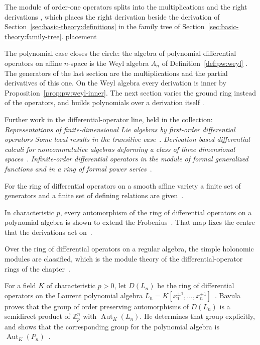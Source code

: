 The module of order-one operators splits into the multiplications and the
right derivations \cite[p.~29]{Sweedler1980}, which places the right
derivation beside the derivation of Section~\ref{sec:basic-theory:definitions}
in the family tree of Section~\ref{sec:basic-theory:family-tree}.
placement

The polynomial case closes the circle: the algebra of polynomial differential
operators on affine $n$-space is the Weyl algebra $A_{n}$ of
Definition~\ref{def:pw:weyl} \cite[p.~1]{BelovKanelKontsevich2007}. The
generators of the last section are the multiplications and the partial
derivatives of this one.
On the Weyl algebra every derivation is inner by
Proposition~\ref{prop:pw:weyl-inner}. The next section varies the ground ring
instead of the operators, and builds polynomials over a derivation itself
\cite[p.~480]{Ore1933}.

Further work in the differential-operator line, held in the collection:
\noindent\emph{Representations of finite-dimensional Lie algebras by
first-order differential operators Some local results in the transitive
case}~\cite{LibRepresentationsOfFiniteDimensional1995}.
\noindent\emph{Derivation based differential calculi for noncommutative
algebras deforming a class of three dimensional
spaces}~\cite{LibDerivationBasedDifferentialCalculi2018}.
\noindent\emph{Infinite-order differential operators in the module of formal
generalized functions and in a ring of formal power
series}~\cite{LibInfiniteOrderDifferentialOperators2022}.

For the ring of differential operators on a smooth affine variety a finite set
of generators and a finite set of defining relations are
given~\cite{WlGeneratorsAndDefining2010}.

In characteristic $p$, every automorphism of the ring of differential operators
on a polynomial algebra is shown to extend the Frobenius~\cite{WlExtensionsOfTheFrobeniusToTheR2017}. That map fixes the
centre that the derivations act
on~\cite{WlExtensionsOfTheFrobeniusToTheR2017}.

Over the ring of differential operators on a regular algebra, the simple
holonomic modules are classified, which is the module theory of the
differential-operator rings of the
chapter~\cite{WlSimpleHolonomicModulesOverRing2019}.

For a field $K$ of characteristic $p>0$, let $D(L_n)$ be the ring of
differential operators on the
Laurent polynomial algebra $L_n=K[x_1^{\pm1},\dots,x_n^{\pm1}]$~\cite{WlTheGroupOfOrderPreservingAutom2009}. Bavula proves
that the group of order preserving automorphisms of $D(L_n)$ is a
semidirect product of $\mathbb{Z}_p^n$ with $\operatorname{Aut}_K(L_n)$. %
He determines that group explicitly, and shows that the corresponding group
for
the polynomial algebra is
$\operatorname{Aut}_K(P_n)$~\cite{WlTheGroupOfOrderPreservingAutom2009}.

